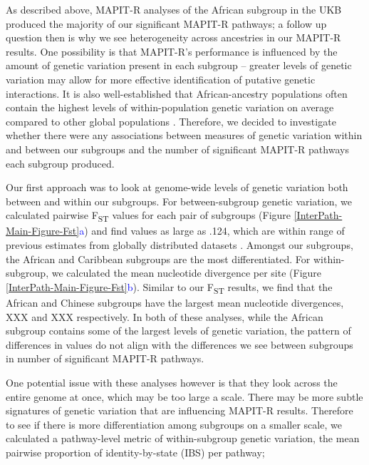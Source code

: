 \documentclass[12pt,a4paper]{article}
\begin{document}
As described above, MAPIT-R analyses of the African subgroup in the UKB produced the majority of our significant MAPIT-R pathways; a follow up question then is why we see heterogeneity across ancestries in our MAPIT-R results. One possibility is that MAPIT-R's performance is influenced by the amount of genetic variation present in each subgroup -- greater levels of genetic variation may allow for more effective identification of putative genetic interactions. It is also well-established that African-ancestry populations often contain the highest levels of within-population genetic variation on average compared to other global populations \citep{International2010,Genomes2015,Mallick2016}. Therefore, we decided to investigate whether there were any associations between measures of genetic variation within and between our subgroups and the number of significant MAPIT-R pathways each subgroup produced.

Our first approach was to look at genome-wide levels of genetic variation both between and within our subgroups. For between-subgroup genetic variation, we calculated pairwise F\textsubscript{ST} values for each pair of subgroups (Figure \ref{InterPath-Main-Figure-Fst}\textcolor{blue}{a}) and find values as large as .124, which are within range of previous estimates from globally distributed datasets \citep{Ramachandran2005,Weir2005,Henn2011,Wang2012,Sugden2016}. Amongst our subgroups, the African and Caribbean subgroups are  the most differentiated. For within-subgroup, we calculated the mean nucleotide divergence per site (Figure \ref{InterPath-Main-Figure-Fst}\textcolor{blue}{b}). Similar to our F\textsubscript{ST} results, we find that the African and Chinese subgroups have the largest mean nucleotide divergences, XXX and XXX respectively. In both of these analyses, while the African subgroup contains some of the largest levels of genetic variation, the pattern of differences in values do not align with the differences we see between subgroups in number of significant MAPIT-R pathways. 

One potential issue with these analyses however is that they look across the entire genome at once, which may be too large a scale. There may be more subtle signatures of genetic variation that are influencing MAPIT-R results. Therefore to see if there is more differentiation among subgroups on a smaller scale, we calculated a pathway-level metric of within-subgroup genetic variation, the mean pairwise proportion of identity-by-state (IBS) per pathway; 
\end{document}
